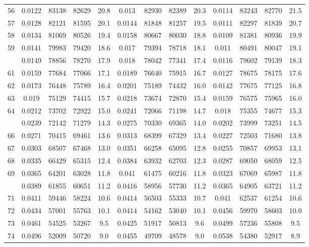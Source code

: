 \documentclass[
  14pt,
]{article}
\begin{document}
\begin{longtable}[t]{lcccccccccccc}
56 & 0.0122 & 83138 & 82629 & 20.8 & 0.013 & 82930 & 82389 & 20.3 & 0.0114 & 83243 & 82770 & 21.5\\
57 & 0.0128 & 82121 & 81595 & 20.1 & 0.0144 & 81848 & 81257 & 19.5 & 0.0111 & 82297 & 81839 & 20.7\\
58 & 0.0134 & 81069 & 80526 & 19.4 & 0.0158 & 80667 & 80030 & 18.8 & 0.0109 & 81381 & 80936 & 19.9\\
59 & 0.0141 & 79983 & 79420 & 18.6 & 0.017 & 79394 & 78718 & 18.1 & 0.011 & 80491 & 80047 & 19.1\\
\addlinespace
60 & 0.0149 & 78856 & 78270 & 17.9 & 0.018 & 78042 & 77341 & 17.4 & 0.0116 & 79602 & 79139 & 18.3\\
61 & 0.0159 & 77684 & 77066 & 17.1 & 0.0189 & 76640 & 75915 & 16.7 & 0.0127 & 78675 & 78175 & 17.6\\
62 & 0.0173 & 76448 & 75789 & 16.4 & 0.0201 & 75189 & 74432 & 16.0 & 0.0142 & 77675 & 77125 & 16.8\\
63 & 0.019 & 75129 & 74415 & 15.7 & 0.0218 & 73674 & 72870 & 15.4 & 0.0159 & 76575 & 75965 & 16.0\\
64 & 0.0212 & 73702 & 72922 & 15.0 & 0.0241 & 72066 & 71198 & 14.7 & 0.018 & 75355 & 74677 & 15.3\\
\addlinespace
65 & 0.0239 & 72142 & 71279 & 14.3 & 0.0275 & 70330 & 69365 & 14.0 & 0.0202 & 73999 & 73251 & 14.5\\
66 & 0.0271 & 70415 & 69461 & 13.6 & 0.0313 & 68399 & 67329 & 13.4 & 0.0227 & 72503 & 71680 & 13.8\\
67 & 0.0303 & 68507 & 67468 & 13.0 & 0.0351 & 66258 & 65095 & 12.8 & 0.0255 & 70857 & 69953 & 13.1\\
68 & 0.0335 & 66429 & 65315 & 12.4 & 0.0384 & 63932 & 62703 & 12.3 & 0.0287 & 69050 & 68059 & 12.5\\
69 & 0.0365 & 64201 & 63028 & 11.8 & 0.041 & 61475 & 60216 & 11.8 & 0.0323 & 67069 & 65987 & 11.8\\
\addlinespace
70 & 0.0389 & 61855 & 60651 & 11.2 & 0.0416 & 58956 & 57730 & 11.2 & 0.0365 & 64905 & 63721 & 11.2\\
71 & 0.0411 & 59446 & 58224 & 10.6 & 0.0414 & 56503 & 55333 & 10.7 & 0.041 & 62537 & 61254 & 10.6\\
72 & 0.0434 & 57001 & 55763 & 10.1 & 0.0414 & 54162 & 53040 & 10.1 & 0.0456 & 59970 & 58603 & 10.0\\
73 & 0.0461 & 54525 & 53267 & 9.5 & 0.0425 & 51917 & 50813 & 9.6 & 0.0499 & 57236 & 55808 & 9.5\\
74 & 0.0496 & 52009 & 50720 & 9.0 & 0.0455 & 49709 & 48578 & 9.0 & 0.0538 & 54380 & 52917 & 8.9\\

\end{longtable}
\end{document}
